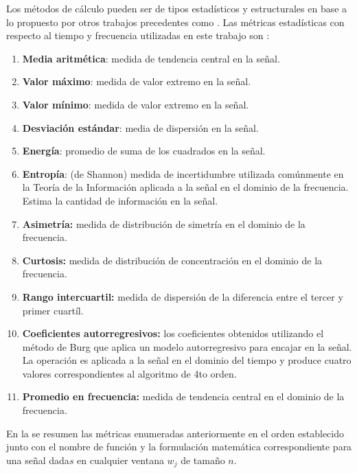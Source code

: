 Los métodos de cálculo pueden ser de tipos estadísticos y estructurales
\cite{LaraLabrador2013} en base a lo propuesto por otros trabajos
precedentes como \cite{Yang2009,Bao2004}. Las métricas estadísticas
con respecto al tiempo y frecuencia utilizadas en este trabajo son
\cite{ReyesOrtiz2015}:
\begin{enumerate}
\item \textbf{Media aritmética}: medida de tendencia central en la señal.
\item \textbf{Valor máximo}: medida de valor extremo en la señal.
\item \textbf{Valor mínimo}: medida de valor extremo en la señal.
\item \textbf{Desviación estándar}: media de dispersión en la señal.
\item \textbf{Energía}: promedio de suma de los cuadrados en la señal.
\item \textbf{Entropía}: (de Shannon) medida de incertidumbre utilizada
comúnmente en la Teoría de la Información aplicada a la señal en el
dominio de la frecuencia. Estima la cantidad de información en la
señal.
\item \textbf{Asimetría:} medida de distribución de simetría en el dominio
de la frecuencia.
\item \textbf{Curtosis:} medida de distribución de concentración en el dominio
de la frecuencia.
\item \textbf{Rango intercuartil:} medida de dispersión de la diferencia
entre el tercer y primer cuartíl.
\item \textbf{Coeficientes autorregresivos:} los coeficientes obtenidos
utilizando el método de Burg que aplica un modelo autorregresivo para
encajar en la señal. La operación es aplicada a la señal en el dominio
del tiempo y produce cuatro valores correspondientes al algoritmo
de 4to orden.
\item \textbf{Promedio en frecuencia:} medida de tendencia central en el
dominio de la frecuencia.
\end{enumerate}
En la  se resumen las métricas enumeradas anteriormente
en el orden establecido junto con el nombre de función y la formulación
matemática correspondiente para una señal dada$s$ en cualquier ventana
$w_{j}$ de tamaño $n$.

